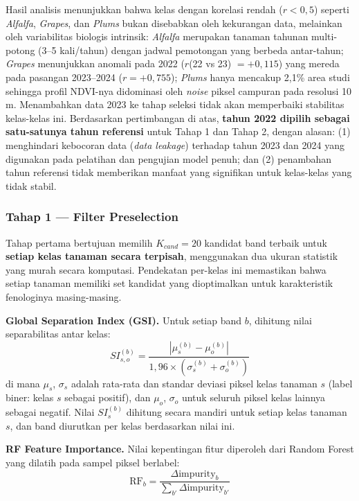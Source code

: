 Hasil analisis menunjukkan bahwa kelas dengan korelasi rendah ($r < 0{,}5$) seperti \textit{Alfalfa}, \textit{Grapes}, dan \textit{Plums} bukan disebabkan oleh kekurangan data, melainkan oleh variabilitas biologis intrinsik:
\textit{Alfalfa} merupakan tanaman tahunan multi-potong (3--5 kali/tahun) dengan jadwal pemotongan yang berbeda antar-tahun;
\textit{Grapes} menunjukkan anomali pada 2022 ($r$(22 vs 23) $= +0{,}115$) yang mereda pada pasangan 2023--2024 ($r = +0{,}755$);
\textit{Plums} hanya mencakup 2{,}1\% area studi sehingga profil NDVI-nya didominasi oleh \textit{noise} piksel campuran pada resolusi 10 m.
Menambahkan data 2023 ke tahap seleksi tidak akan memperbaiki stabilitas kelas-kelas ini.
Berdasarkan pertimbangan di atas, \textbf{tahun 2022 dipilih sebagai satu-satunya tahun referensi} untuk Tahap 1 dan Tahap 2, dengan alasan: (1) menghindari kebocoran data (\textit{data leakage}) terhadap tahun 2023 dan 2024 yang digunakan pada pelatihan dan pengujian model penuh; dan (2) penambahan tahun referensi tidak memberikan manfaat yang signifikan untuk kelas-kelas yang tidak stabil.

\subsubsection{Tahap 1 — Filter Preselection}

Tahap pertama bertujuan memilih $K_{cand} = 20$ kandidat band terbaik untuk \textbf{setiap kelas tanaman secara terpisah}, menggunakan dua ukuran statistik yang murah secara komputasi. Pendekatan per-kelas ini memastikan bahwa setiap tanaman memiliki set kandidat yang dioptimalkan untuk karakteristik fenologinya masing-masing.

\textbf{Global Separation Index (GSI).}
Untuk setiap band $b$, dihitung nilai separabilitas antar kelas:
\begin{equation}
    SI_{s,o}^{(b)} = \frac{|\mu_s^{(b)} - \mu_o^{(b)}|}{1{,}96 \times (\sigma_s^{(b)} + \sigma_o^{(b)})}
\end{equation}
di mana $\mu_s$, $\sigma_s$ adalah rata-rata dan standar deviasi piksel kelas tanaman $s$ (label biner: kelas $s$ sebagai positif), dan $\mu_o$, $\sigma_o$ untuk seluruh piksel kelas lainnya sebagai negatif. Nilai $SI_{s}^{(b)}$ dihitung secara mandiri untuk setiap kelas tanaman $s$, dan band diurutkan per kelas berdasarkan nilai ini.

\textbf{RF Feature Importance.}
Nilai kepentingan fitur diperoleh dari Random Forest yang dilatih pada sampel piksel berlabel:
\begin{equation}
    \text{RF}_{b} = \frac{\Delta \text{impurity}_b}{\sum_{b'} \Delta \text{impurity}_{b'}}
\end{equation}

